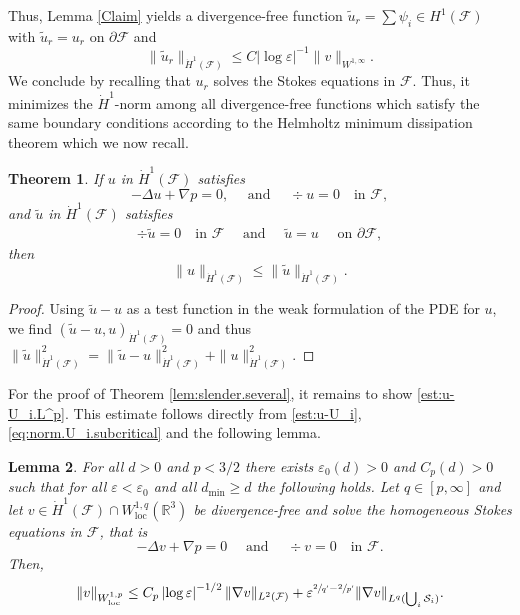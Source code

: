 \documentclass[11pt]{article}
\let\oldbigcup\bigcup
\newcommand{\R}{\mathbb{R}}
\let\eps\varepsilon
\newcommand{\cS}{\mathcal{S}}
\newcommand{\dmin}{d_{\min}}
\newcommand{\loc}{\mathrm{loc}}
\newtheorem{thm}{Theorem}[section]
\newtheorem{Lemma}[thm]{Lemma}
\theoremstyle{definition}
\theoremstyle{remark}
\begin{document}
Thus, Lemma \ref{Claim} yields a divergence-free function $\tilde u_r = \sum \psi_i \in H^1(\mathcal F)$ with $\tilde u_r = u_r$ on $\partial \mathcal F$ and
\begin{equation}
\|\tilde u_r \|_{\dot H^1(\mathcal F)} \leq C \left|\log \eps \right|^{-1} \|v\|_{W^{1,\infty}}.
\end{equation}
We conclude by recalling that $u_r$ solves the Stokes equations in $\mathcal F$. Thus, it minimizes the $\dot H^1$-norm among all divergence-free functions which satisfy the same boundary conditions according to the Helmholtz minimum dissipation theorem which we now recall.

\begin{thm}
\label{Helmholtz}
If $u $ in $\dot H^1({\mathcal F})$ satisfies
\begin{equation*}
- \Delta u + \nabla p = 0, \quad \text{ and }\quad \div u = 0 \quad \text{in } \mathcal F,
\end{equation*}
and $\tilde u $ in $\dot H^1({\mathcal F})$ satisfies
\begin{equation*}
\begin{aligned}
\div \tilde u = 0 \quad \text{in } \mathcal F \quad \text{ and }\quad
\tilde u = u \quad \text{ on } \partial \mathcal F,
\end{aligned}
\end{equation*}
then
\begin{equation*}
\|u\|_{\dot H^1({\mathcal F})}
\leq \|\tilde u\|_{\dot H^1({\mathcal F})}.
\end{equation*}
\end{thm}
\begin{proof}
Using $\tilde u - u$ as a test function in the weak formulation of the PDE for $u$, we find $(\tilde u - u,u)_{\dot H^1({\mathcal F})} =0$
and thus $\|\tilde u\|^2_{\dot H^1({\mathcal F})} = \|\tilde u - u\|^2_{\dot H^1({\mathcal F})} + \| u\|^2_{\dot H^1({\mathcal F})}$.
\end{proof}

For the proof of Theorem \ref{lem:slender.several}, it remains to show \eqref{est:u-U_i.L^p}. This estimate follows directly from \eqref{est:u-U_i}, \eqref{eq:norm.U_i.subcritical} and the following lemma.

\begin{Lemma}\label{lem:improved}
For all $d> 0$ and $p < 3/2$ there exists $\eps_0(d)>0$ and $C_p(d)>0$ such that for all $\eps < \eps_0$ and all $\dmin \geq d$ the following holds. Let $q \in [p,\infty]$ and let $v \in \dot H^1(\mathcal F) \cap W^{1,q}_{\loc}(\R^3)$ be divergence-free and solve the homogeneous Stokes equations in $\mathcal F$, that is
\begin{equation*}
- \Delta v + \nabla p = 0 \quad \text{ and } \quad \div v = 0 \quad \text{in } \mathcal F.
\end{equation*}
Then,
\begin{equation}
\|v\|_{W^{1,p}_\loc} \leq C_p \left|\log \eps\right|^{-1/2} \|\nabla v\|_{L^2(\mathcal F)} + \eps^{\sfrac 2 {q'} - \sfrac{2}{p'}} \|\nabla v\|_{L^q(\oldbigcup_i \cS_i)}.
\end{equation}
\end{Lemma}
\end{document}
